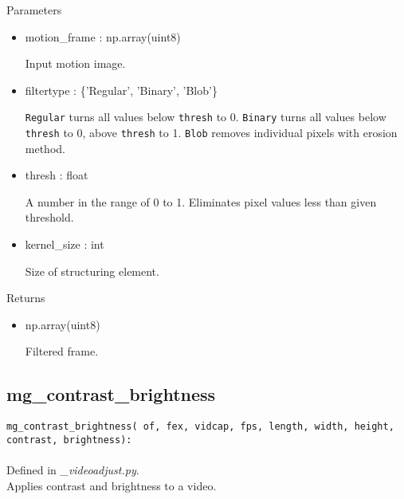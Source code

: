 \documentclass[9pt]{extarticle}
\def\code#1{\texttt{#1}}
\begin{document}
\noindent Parameters
\begin{itemize}
\item motion\_frame : np.array(uint8) 

    Input motion image.
\item filtertype : \{'Regular', 'Binary', 'Blob'\}

\code{Regular} turns all values below \code{thresh} to 0.
\code{Binary} turns all values below \code{thresh} to 0, 
above \code{thresh} to 1. \code{Blob} removes individual pixels 
with erosion method.

\item thresh : float

A number in the range of 0 to 1.
Eliminates pixel values less than given threshold.

\item kernel\_size : int

Size of structuring element.
\end{itemize}

\noindent Returns
\begin{itemize}
\item np.array(uint8)

Filtered frame.
\end{itemize}


\subsection{mg\_contrast\_brightness}

\code{mg\_contrast\_brightness(
    of, 
    fex, 
    vidcap, 
    fps, 
    length, 
    width, 
    height, 
    contrast, 
    brightness):}
\\\\
Defined in \textit{\_videoadjust.py}.\\
Applies contrast and brightness to a video.
\\\\
\end{document}
